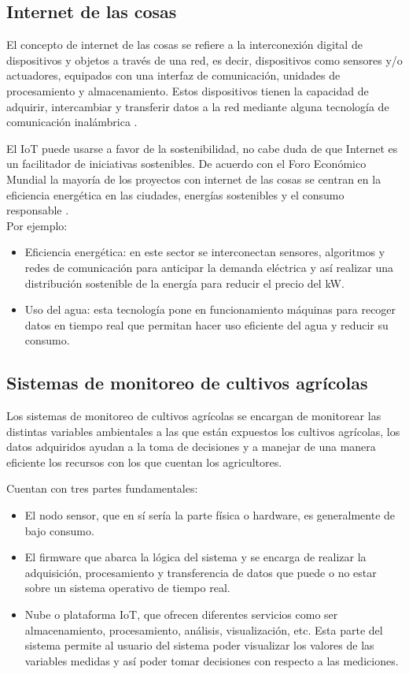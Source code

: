 \subsection{Internet de las cosas}
El concepto de internet de las cosas se refiere a la interconexión digital de dispositivos y objetos a través de una red, es decir, dispositivos como sensores y/o actuadores, equipados con una interfaz de comunicación, unidades de procesamiento y almacenamiento. Estos dispositivos tienen la capacidad de adquirir, intercambiar y transferir datos a la red mediante alguna tecnología de comunicación inalámbrica \citep{WirelessComunications}.

El IoT puede usarse a favor de la sostenibilidad, no cabe duda de que Internet es un facilitador de iniciativas sostenibles. De acuerdo con el Foro Económico Mundial la mayoría de los proyectos con internet de las cosas se centran en la eficiencia energética en las ciudades, energías sostenibles y el consumo responsable \citep{InternetDeLasCosas}. 
\\Por ejemplo:
\begin{itemize}
  \item Eficiencia energética: en este sector se interconectan sensores, algoritmos y redes de comunicación para anticipar la demanda eléctrica y así realizar una distribución sostenible de la energía para reducir el precio del kW.
  \item Uso del agua: esta tecnología pone en funcionamiento máquinas para recoger datos en tiempo real que permitan hacer uso eficiente del agua y reducir su consumo.
  
\end{itemize}

\subsection{Sistemas de monitoreo de cultivos agrícolas}
Los sistemas de monitoreo de cultivos agrícolas se encargan de monitorear
las distintas variables ambientales a las que están expuestos los cultivos agrícolas, los datos adquiridos ayudan a la toma de decisiones y a manejar de una manera eficiente los recursos con los que cuentan los agricultores.

Cuentan con tres partes fundamentales: 
\begin{itemize}
  \item El nodo sensor, que en sí sería la parte física o hardware, es generalmente de bajo consumo.
  \item El firmware que abarca la lógica del sistema y se encarga de realizar la adquisición, procesamiento y transferencia de datos que puede o no estar sobre un sistema operativo de tiempo real.
  \item Nube o plataforma IoT, que ofrecen diferentes servicios como ser almacenamiento, procesamiento, análisis, visualización, etc. Esta parte del sistema permite al usuario del sistema poder visualizar los valores de las variables medidas y así poder tomar decisiones con respecto a las mediciones.
\end{itemize}

